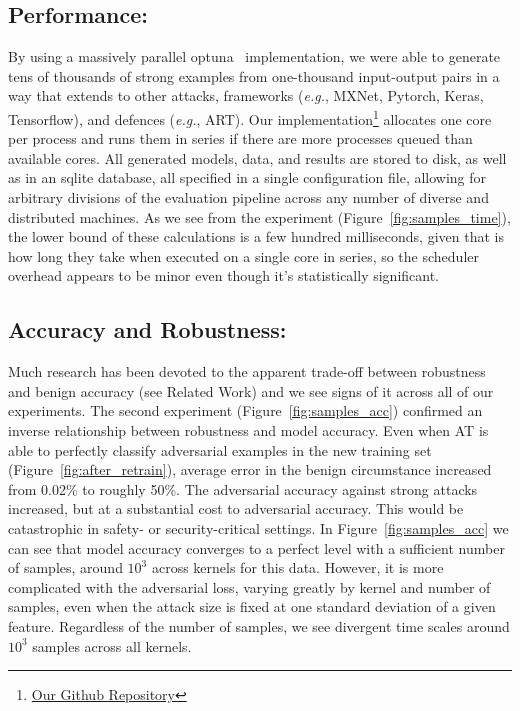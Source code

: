 \documentclass[fonts]{icst}
\begin{document}
\subsection{Performance: }
By using a massively parallel optuna~\cite{optuna} implementation, we were able to generate tens of thousands of strong examples from one-thousand input-output pairs in a way that extends to other attacks, frameworks
(\textit{e.g.}, MXNet, Pytorch, Keras, Tensorflow), and defences (\textit{e.g.}, ART).
Our implementation\footnote{\href{https://github.com/simplymathematics/deckard/tree/main/examples/security}{Our Github Repository}} allocates one core per process and runs them in series if there are more processes queued than available cores.
All generated models, data, and results are stored to disk, as well as in an sqlite database, all specified in a single configuration file, allowing for arbitrary divisions of the evaluation pipeline across any number of diverse and distributed machines.
As we see from the experiment (Figure~\ref{fig:samples_time}), the lower bound of these calculations is a few hundred milliseconds, given that is how long they take when executed on a single core in series, so the scheduler overhead appears to be minor even though it's statistically significant.

\subsection{Accuracy and Robustness:}
Much research has been devoted to the apparent trade-off between robustness and benign accuracy (see Related Work) and we see signs of it across all of our experiments.
The second experiment (Figure~\ref{fig:samples_acc}) confirmed an inverse relationship between robustness and model accuracy.
Even when AT is able to perfectly classify adversarial examples in the new training set (Figure~\ref{fig:after_retrain}), average error in the benign circumstance increased from 0.02\% to roughly 50\%.
The adversarial accuracy against strong attacks increased, but at a substantial cost to adversarial accuracy.
This would be catastrophic in safety- or security-critical settings.
In Figure~\ref{fig:samples_acc} we can see that model accuracy converges to a perfect level with a sufficient number of samples, around $10^3$ across kernels for this data.
However, it is more complicated with the adversarial loss, varying greatly by kernel and number of samples, even when the attack size is fixed at one standard deviation of a given feature.
Regardless of the number of samples, we see divergent time scales around $10^3$ samples across all kernels.
\end{document}
